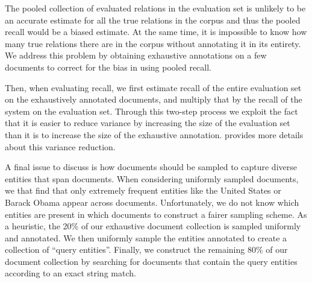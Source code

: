 The pooled collection of evaluated relations in the evaluation set is unlikely to be an accurate estimate for all the true relations in the corpus and thus the pooled recall would be a biased estimate.
At the same time, it is impossible to know how many true relations there are in the corpus without annotating it in its entirety.
We address this problem by obtaining exhaustive annotations on a few documents to correct for the bias in using pooled recall.


Then, when evaluating recall, we first estimate recall of the entire evaluation set on the exhaustively annotated documents, and multiply that by the recall of the system on the evaluation set. Through this two-step process we exploit the fact that it is easier to reduce variance by increasing the size of the evaluation set than it is to increase the size of the exhaustive annotation.  provides more details about this variance reduction.

A final issue to discuss is how documents should be sampled to capture diverse entities that span documents. %
When considering uniformly sampled documents, we that find that only extremely frequent entities like the United States or Barack Obama appear across documents.
Unfortunately, we do not know which entities are present in which documents to construct a fairer sampling scheme.
As a heuristic, the 20\% of our exhaustive document collection is sampled uniformly and annotated.
We then uniformly sample the entities annotated to create a collection of ``query entities''.
Finally, we construct the remaining 80\% of our document collection by searching for documents that contain the query entities according to an exact string match.

